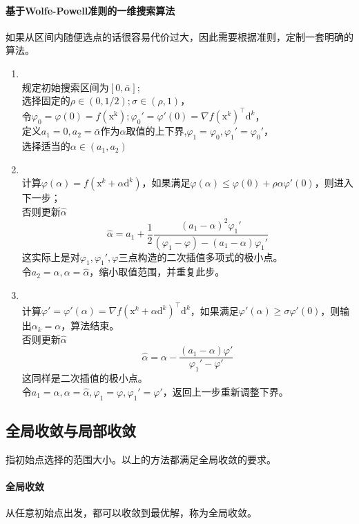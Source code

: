 \documentclass[a4paper]{D:/repositories/MyDGP/latex/PaperReadingLog}
\begin{document}
\paragraph{基于Wolfe-Powell准则的一维搜索算法}
如果从区间内随便选点的话很容易代价过大，因此需要根据准则，定制一套明确的算法。
\begin{enumerate}
    \item {}\\规定初始搜索区间为$[0,\bar{\alpha}]$;\\选择固定的$\rho\in(0,1/2);\sigma\in(\rho,1)$，\\令$\varphi_0=\varphi(0)=f(\mathrm{x^k});\varphi_0'=\varphi'(0)=\nabla f(\mathrm{x}^k)^\top\mathrm{d}^k$，\\定义$a_1=0,a_2=\bar{\alpha}$作为$\alpha$取值的上下界,$\varphi_1=\varphi_0,\varphi_1'=\varphi_0'$，\\选择适当的$\alpha\in(a_1,a_2)$
    \item {}\\
    计算$\varphi(\alpha)=f(\mathrm{x}^k+\alpha\mathrm{d}^k)$，如果满足$\varphi(\alpha)\le \varphi(0)+\rho\alpha\varphi'(0)$，则进入下一步；\\
    否则更新$\hat{\alpha}$
    $$
    \hat{\alpha}=a_1+\frac{1}{2}\frac{(a_1-\alpha)^2\varphi_1'}{(\varphi_1-\varphi)-(a_1-\alpha)\varphi_1'}
    $$
    这实际上是对$\varphi_1,\varphi_1',\varphi$三点构造的二次插值多项式的极小点。\\
    令$a_2=\alpha,\alpha=\hat{\alpha}$，缩小取值范围，并重复此步。
    \item {}\\
    计算$\varphi'=\varphi'(\alpha)=\nabla f(\mathrm{x}^k+\alpha\mathrm{d}^k)^\top\mathrm{d}^k$，如果满足$\varphi'(\alpha)\ge\sigma\varphi'(0)$，则输出$\alpha_k=\alpha$，算法结束。\\
    否则更新$\hat{\alpha}$
    $$
    \hat{\alpha}=\alpha-\frac{(a_1-\alpha)\varphi'}{\varphi_1'-\varphi'}
    $$
    这同样是二次插值的极小点。\\
    令$a_1=\alpha,\alpha=\hat{\alpha},\varphi_1=\varphi,\varphi_1'=\varphi'$，返回上一步重新调整下界。
\end{enumerate}

\subsection{全局收敛与局部收敛}
指初始点选择的范围大小。以上的方法都满足全局收敛的要求。

\paragraph{全局收敛}从任意初始点出发，都可以收敛到最优解，称为全局收敛。
\end{document}
